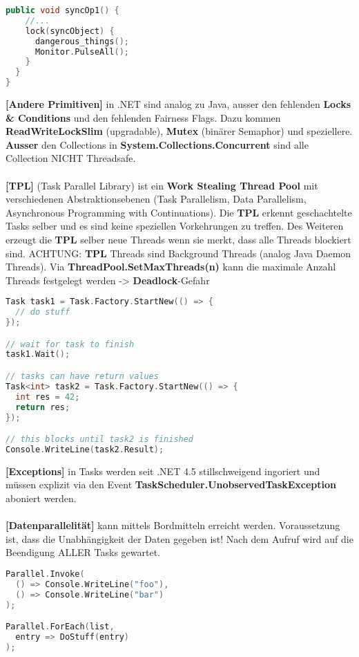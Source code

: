 \documentclass[8pt]{extarticle}
\let\oldtextbf\textbf
\renewcommand{\textbf}{\tiny\oldtextbf}
\begin{document}
\begin{multicols*}{5}
\begin{lstlisting}[language=c++]
  public void syncOp1() {
    //...
    lock(syncObject) {
      dangerous_things();
      Monitor.PulseAll();
    }
  }
}
\end{lstlisting}
\textbf{[Andere Primitiven]} in .NET sind analog zu Java, ausser den fehlenden \textbf{Locks \& Conditions} und den  fehlenden Fairness Flags. Dazu kommen \textbf{ReadWriteLockSlim} (upgradable), \textbf{Mutex} (binärer Semaphor) und speziellere. \textbf{Ausser} den Collections in \textbf{System.Collections.Concurrent} sind alle Collection NICHT Threadsafe.\\\\
\textbf{[TPL]} (Task Parallel Library) ist ein \textbf{Work Stealing Thread Pool} mit verschiedenen Abstraktionsebenen (Task Parallelism, Data Parallelism, Asynchronous Programming with Continuations). Die \textbf{TPL} erkennt geschachtelte Tasks selber und es sind keine speziellen Vorkehrungen zu treffen. Des Weiteren erzeugt die \textbf{TPL} selber neue Threads wenn sie merkt, dass alle Threads blockiert sind. ACHTUNG: \textbf{TPL} Threads sind Background Threads (analog Java Daemon Threads). Via \textbf{ThreadPool.SetMaxThreads(n)} kann die maximale Anzahl Threads festgelegt werden -> \textbf{Deadlock}-Gefahr
\begin{lstlisting}[language=c++]
Task task1 = Task.Factory.StartNew(() => {
  // do stuff
});

// wait for task to finish
task1.Wait();

// tasks can have return values
Task<int> task2 = Task.Factory.StartNew(() => {
  int res = 42;
  return res;
});

// this blocks until task2 is finished
Console.WriteLine(task2.Result);
\end{lstlisting}
\textbf{[Exceptions]} in Tasks werden seit .NET 4.5 stillschweigend ingoriert und müssen explizit via den Event \textbf{TaskScheduler.UnobservedTaskException} aboniert werden.\\\\
\textbf{[Datenparallelität]} kann mittels Bordmitteln erreicht werden. Voraussetzung ist, dass die Unabhängigkeit der Daten gegeben ist! Nach dem Aufruf wird auf die Beendigung ALLER Tasks gewartet.
\begin{lstlisting}[language=c++]
Parallel.Invoke(
  () => Console.WriteLine("foo"),
  () => Console.WriteLine("bar")
);

Parallel.ForEach(list,
  entry => DoStuff(entry)
);


\end{lstlisting}
\end{multicols*}
\end{document}
